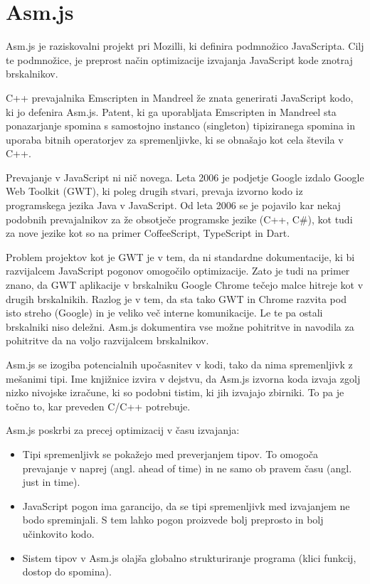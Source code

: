 \chapter{Asm.js}
\label{sec:asm}
Asm.js \cite{asm} je raziskovalni projekt pri Mozilli, ki definira podmnožico JavaScripta. Cilj te podmnožice, je preprost način optimizacije izvajanja JavaScript kode znotraj brskalnikov.

C++ prevajalnika Emscripten in Mandreel že znata generirati JavaScript kodo, ki jo defenira Asm.js. Patent, ki ga uporabljata Emscripten in Mandreel sta ponazarjanje spomina s samostojno instanco (singleton) tipiziranega spomina in uporaba bitnih operatorjev za spremenljivke, ki se obnašajo kot cela števila v C++.

Prevajanje v JavaScript ni nič novega. Leta 2006 je podjetje Google izdalo Google Web Toolkit (GWT), ki poleg drugih stvari, prevaja izvorno kodo iz programskega jezika Java v JavaScript. Od leta 2006 se je pojavilo kar nekaj podobnih prevajalnikov za že obsotječe programske jezike (C++, C\#), kot tudi za nove jezike kot so na primer CoffeeScript, TypeScript in Dart.

Problem projektov kot je GWT je v tem, da ni standardne dokumentacije, ki bi razvijalcem JavaScript pogonov omogočilo optimizacije. Zato je tudi na primer znano, da GWT aplikacije v brskalniku Google Chrome tečejo malce hitreje kot v drugih brskalnikih. Razlog je v tem, da sta tako GWT in Chrome razvita pod isto streho (Google) in je veliko več interne komunikacije. Le te pa ostali brskalniki niso deležni. Asm.js dokumentira vse možne pohitritve in navodila za pohitritve da na voljo razvijalcem brskalnikov.

Asm.js se izogiba potencialnih upočasnitev v kodi, tako da nima spremenljivk z mešanimi tipi. Ime knjižnice izvira v dejstvu, da Asm.js izvorna koda izvaja zgolj nizko nivojske izračune, ki so podobni tistim, ki jih izvajajo zbirniki. To pa je točno to, kar preveden C/C++ potrebuje.

Asm.js poskrbi za precej optimizacij v času izvajanja:

\begin{itemize}
\item Tipi spremenljivk se pokažejo med preverjanjem tipov. To omogoča prevajanje v naprej (angl. ahead of time) in ne samo ob pravem času (angl. just in time).
\item JavaScript pogon ima garancijo, da se tipi spremenljivk med izvajanjem ne bodo spreminjali. S tem lahko pogon proizvede bolj preprosto in bolj učinkovito kodo. 
\item Sistem tipov v Asm.js olajša globalno strukturiranje programa (klici funkcij, dostop do spomina).
\end{itemize}

